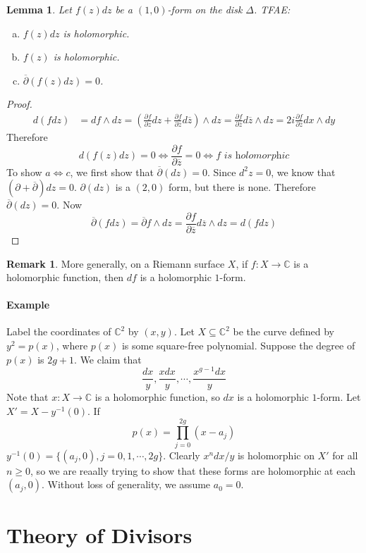\documentclass[12pt]{article}
\theoremstyle{plain}
\newtheorem{lemma}[equation]{Lemma}
\theoremstyle{definition}
\newtheorem{remark}[equation]{Remark}
\newcommand{\IC}{\mathbb{C}}
\newcommand{\<}{\langle}
\renewcommand{\>}{\rangle}
\newcommand{\bp}{\overline{\partial}}
\newcommand{\p}{\partial}
\newcommand{\bz}{\overline{z}}
\begin{document}
\begin{lemma}
Let $f(z) dz$ be a $(1, 0)$-form on the disk $\Delta$. TFAE:
\begin{enumerate}[a.]
\item $f(z)dz$ is holomorphic. 
\item $f(z)$ is holomorphic. 
\item $\bp(f(z)dz) = 0$. 
\end{enumerate} 
\end{lemma}
\begin{proof}
\begin{align*}
d(fdz) &= df \wedge dz = (\frac{\p f}{\p z} dz + \frac{\p f}{\p \bz} d \bz) \wedge dz = \frac{\p f}{\p \bz} d \bz \wedge d z = 2i \frac{\p f}{\p \bz} dx \wedge dy
\end{align*}
Therefore 
$$ d(f(z)dz) = 0 \iff \frac{\p f}{\p \bz} = 0 \iff f \textit{ is holomorphic}$$
To show $a \iff c$, we first show that $\bp (dz) = 0$. Since $d^2 z = 0$, we know that $(\p + \bp) dz = 0$. $\p (dz)$ is a $(2, 0)$ form, but there is none. Therefore $\bp(dz) = 0$. Now 
$$ \bp (fdz) = \bp f \wedge dz = \frac{\p f}{\p \bz} d\bz \wedge dz = d(fdz) $$
\end{proof}
\begin{remark}
More generally, on a Riemann surface $X$, if $f : X \to \IC$ is a holomorphic function, then $df$ is a holomorphic $1$-form. 
\end{remark}

\paragraph{Example} Label the coordinates of $\IC^2$ by $(x, y)$. Let $X \subseteq \IC^2$ be the curve defined by $y^2 = p(x)$, where $p(x)$ is some square-free polynomial. Suppose the degree of $p(x)$ is $2g + 1$. We claim that 
$$ \frac{dx}{y}, \frac{x dx}{y}, \cdots, \frac{x^{g - 1} dx}{y} $$
Note that $x: X \to \IC$ is a holomorphic function, so $dx$ is a holomorphic $1$-form. Let $X' = X - y^{-1}(0)$. If 
$$ p(x) = \prod_{j = 0}^{2g} (x - a_j) $$
$y^{-1}(0) = \{ (a_j, 0), j = 0, 1, \cdots, 2g \}$. Clearly $x^n dx /y$ is holomorphic on $X'$ for all $n \ge 0$, so we are reaally trying to show that these forms are holomorphic at each $(a_j, 0)$. Without loss of generality, we assume $a_0 = 0$.  

\section{Theory of Divisors}
\end{document}
